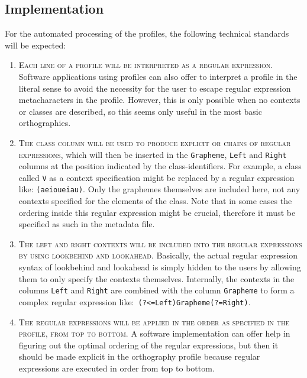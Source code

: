 \subsection*{Implementation}
For the automated processing of the profiles, the following technical standards
will be expected:

\begin{enumerate}
	\def\labelenumi{B\arabic{enumi}.} 
	\item \textsc{Each line of a profile will be interpreted as a regular
       expression.} Software applications using profiles can also offer to
       interpret a profile in the literal sense to avoid the necessity for the
       user to escape regular expression metacharacters in the profile.
       However, this is only possible when no contexts or classes are described,
       so this seems only useful in the most basic orthographies. 
	\item \textsc{The \textsc{class} column will be used to produce explicit
       \textsc{or} chains of regular expressions}, which will then be inserted
       in the \texttt{Grapheme}, \texttt{Left} and \texttt{Right} columns at
       the position indicated by the class-identifiers. For example, a class
       called \texttt{V} as a context specification might be replaced by a regular
       expression like:
       \texttt{(a\textbar{}e\textbar{}i\textbar{}o\textbar{}u\textbar{}ei\textbar{}au)}.
       Only the graphemes themselves are included here, not any contexts
       specified for the elements of the class. Note that in some cases the 
       ordering inside this regular expression might be crucial, therefore it must be 
	   specified as such in the metadata file.
	\item \textsc{The \textsc{left} and \textsc{right} contexts will be included
       into the regular expressions by using lookbehind and lookahead}.
       Basically, the actual regular expression syntax of lookbehind and
       lookahead is simply hidden to the users by allowing them to only specify
       the contexts themselves. Internally, the contexts in the columns
       \texttt{Left} and \texttt{Right} are combined with the column
       \texttt{Grapheme} to form a complex regular expression like:\ 
       \texttt{(?\textless{}=Left)Grapheme(?=Right)}. 
	\item \textsc{The regular expressions will be applied in the order as specified
       in the profile, from top to bottom.} A software implementation can offer
       help in figuring out the optimal ordering of the regular expressions, but
       then it should be made explicit in the orthography profile because regular 
	   expressions are executed in order from top to bottom.
\end{enumerate}


